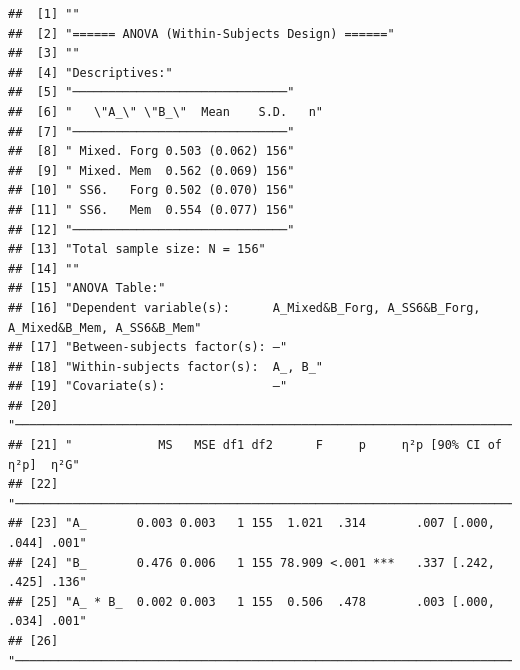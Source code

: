 \documentclass[
  man]{apa6}
\begin{document}
\begin{verbatim}
##  [1] ""                                                                                       
##  [2] "====== ANOVA (Within-Subjects Design) ======"                                           
##  [3] ""                                                                                       
##  [4] "Descriptives:"                                                                          
##  [5] "──────────────────────────────"                                                         
##  [6] "   \"A_\" \"B_\"  Mean    S.D.   n"                                                     
##  [7] "──────────────────────────────"                                                         
##  [8] " Mixed. Forg 0.503 (0.062) 156"                                                         
##  [9] " Mixed. Mem  0.562 (0.069) 156"                                                         
## [10] " SS6.   Forg 0.502 (0.070) 156"                                                         
## [11] " SS6.   Mem  0.554 (0.077) 156"                                                         
## [12] "──────────────────────────────"                                                         
## [13] "Total sample size: N = 156"                                                             
## [14] ""                                                                                       
## [15] "ANOVA Table:"                                                                           
## [16] "Dependent variable(s):      A_Mixed&B_Forg, A_SS6&B_Forg, A_Mixed&B_Mem, A_SS6&B_Mem"   
## [17] "Between-subjects factor(s): –"                                                          
## [18] "Within-subjects factor(s):  A_, B_"                                                     
## [19] "Covariate(s):               –"                                                          
## [20] "──────────────────────────────────────────────────────────────────────"                 
## [21] "            MS   MSE df1 df2      F     p     η²p [90% CI of η²p]  η²G"                 
## [22] "──────────────────────────────────────────────────────────────────────"                 
## [23] "A_       0.003 0.003   1 155  1.021  .314       .007 [.000, .044] .001"                 
## [24] "B_       0.476 0.006   1 155 78.909 <.001 ***   .337 [.242, .425] .136"                 
## [25] "A_ * B_  0.002 0.003   1 155  0.506  .478       .003 [.000, .034] .001"                 
## [26] "──────────────────────────────────────────────────────────────────────"                 

\end{verbatim}
\end{document}
